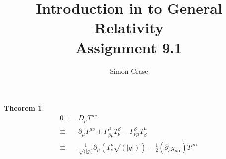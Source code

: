 \documentclass[]{article}
\title{Introduction in to General Relativity\\Assignment 9.1}
\author{Simon Crase}
\newtheorem{theorem}{Theorem}
\begin{document}
\maketitle

\begin{abstract}
\end{abstract}

\begin{theorem}
	\begin{align*}
	0 =& D_{\mu} T^{\mu\nu} \\
	\equiv & \partial_{\mu} T^{\mu\nu} + \Gamma^{\mu}_{\beta\mu}T^{\beta}_{\nu}-\Gamma^{\beta}_{\nu\mu}T^{\mu}_{\beta}\\
	\equiv& \frac{1}{\sqrt(|g|)}\partial_{\mu}(T^{\mu}_{\nu}\sqrt{(|g|)}) - \frac{1}{2}(\partial_{\mu}g_{\mu\alpha})T^{\mu\alpha}
	\end{align*}
\end{theorem}
\end{document}
